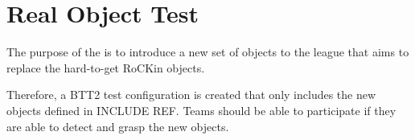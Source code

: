 
\section{Real Object Test}

The purpose of the  is to introduce a new set of objects to the league that aims to replace the hard-to-get RoCKin objects.

Therefore, a BTT2 test configuration is created that only includes the new objects defined in INCLUDE REF. Teams should be able to participate if they are able to detect and grasp the new objects.
